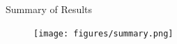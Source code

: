 \documentclass[aspectratio=169]{beamer}
\begin{document}

 

\begin{frame}[noframenumbering]{Summary of Results}
	\vspace*{-5pt}
	\begin{figure}[htpb]
		\centering
		\texttt{[image: figures/summary.png]}
	\end{figure}
\end{frame}
\end{document}
